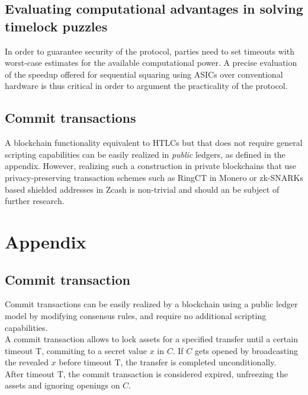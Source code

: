 \documentclass{article}      	%
\begin{document}
\subsection*{Evaluating computational advantages in solving timelock puzzles}
In order to guarantee security of the protocol, parties need to set timeouts with worst-case estimates for the available computational power. A precise evaluation of the speedup offered for sequential squaring using ASICs \cite{squaring_asic} over conventional hardware is thus critical in order to argument the practicality of the protocol.

\subsection*{Commit transactions}
A blockchain functionality equivalent to HTLCs but that does not require general scripting capabilities can be easily realized in \textit{public} ledgers, as defined in the appendix. However, realizing such a construction in private blockchains that use privacy-preserving transaction schemes such as RingCT \cite{ring_signatures} in Monero or zk-SNARKs based shielded addresses in Zcash \cite{zcash} is non-trivial and should an be subject of further research.

\newpage
\printbibliography

\newpage

\appendix


\section*{Appendix}
\subsection*{Commit transaction}

Commit transactions can be easily realized by a blockchain using a public ledger model by modifying consensus rules, and require no additional scripting capabilities.  \\
A commit transaction allows to lock assets for a specified transfer until a certain timeout T, commiting to a secret value $x$ in $C$. If $C$ gets opened by broadcasting the revealed $x$ before timeout T, the transfer is completed unconditionally. \\ 
After timeout T, the commit transaction is considered expired, unfreezing the assets and ignoring openings on $C$.
\end{document}
